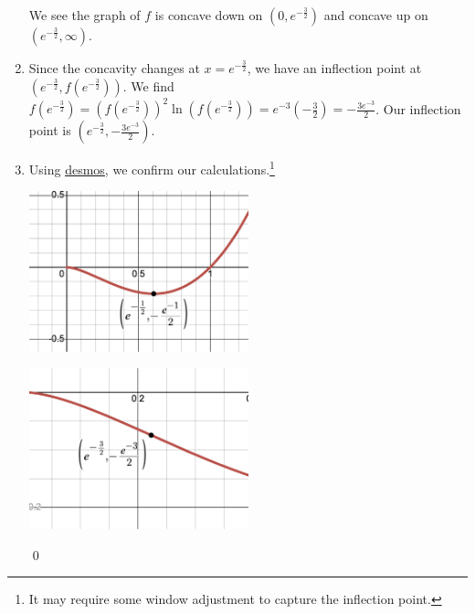 \documentclass{ximera}
\begin{document}
\begin{ex}
\begin{enumerate}
\begin{center}
\begin{multicols}{2}
\end{multicols}
\end{center}

We see the graph of $f$ is concave down on $\left(0, e^{-\frac{3}{2}} \right)$ and concave up on $\left(e^{-\frac{3}{2}} , \infty \right)$.


\item  Since the concavity changes at $x = e^{-\frac{3}{2}}$, we have an inflection point at $\left( e^{-\frac{3}{2}}, f \left(e^{-\frac{3}{2}}\right) \right)$.  We find $f \left(e^{-\frac{3}{2}}\right)  = \left(f \left(e^{-\frac{3}{2}}\right) \right)^2 \ln \left(f \left(e^{-\frac{3}{2}}\right) \right) = e^{-3} \left(-\frac{3}{2} \right) = -\frac{3e^{-3}}{2}$.  Our inflection point is $\left( e^{-\frac{3}{2}},  -\frac{3e^{-3}}{2} \right)$.

\item  Using  \href{https://www.desmos.com/calculator}{\underline{desmos}}, we confirm our calculations.\footnote{It may require some window adjustment to capture the inflection point.}

\begin{center}

\begin{multicols}{2}

\includegraphics[width=2.5in]{./LogarithmicEquationsandInequalitiesGraphics/x^2ln(x)min.PNG}

\includegraphics[width=2.5in]{./LogarithmicEquationsandInequalitiesGraphics/x^2ln(x)IP.PNG} \\

\end{multicols}

\end{center}

\hfill \qed

\end{enumerate}

\end{ex}
\end{document}
